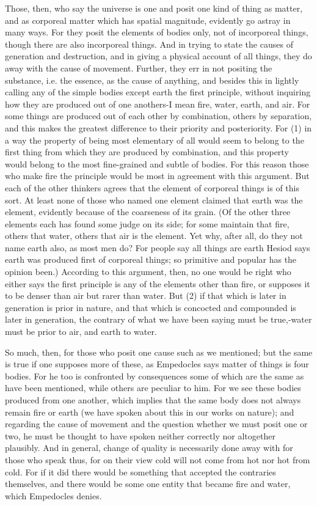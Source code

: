 \documentclass{article}
\begin{document}
Those, then, who say the universe is one and posit one kind of thing as matter, and as corporeal matter which has spatial magnitude, evidently go astray in many ways. For they posit the elements of bodies only, not of incorporeal things, though there are also incorporeal things. And in trying to state the causes of generation and destruction, and in giving a physical account of all things, they do away with the cause of movement. Further, they err in not positing the substance, i.e. the essence, as the cause of anything, and besides this in lightly calling any of the simple bodies except earth the first principle, without inquiring how they are produced out of one anothers-I mean fire, water, earth, and air. For some things are produced out of each other by combination, others by separation, and this makes the greatest difference to their priority and posteriority. For (1) in a way the property of being most elementary of all would seem to belong to the first thing from which they are produced by combination, and this property would belong to the most fine-grained and subtle of bodies. For this reason those who make fire the principle would be most in agreement with this argument. But each of the other thinkers agrees that the element of corporeal things is of this sort. At least none of those who named one element claimed that earth was the element, evidently because of the coarseness of its grain. (Of the other three elements each has found some judge on its side; for some maintain that fire, others that water, others that air is the element. Yet why, after all, do they not name earth also, as most men do? For people say all things are earth Hesiod says earth was produced first of corporeal things; so primitive and popular has the opinion been.) According to this argument, then, no one would be right who either says the first principle is any of the elements other than fire, or supposes it to be denser than air but rarer than water. But (2) if that which is later in generation is prior in nature, and that which is concocted and compounded is later in generation, the contrary of what we have been saying must be true,-water must be prior to air, and earth to water.

So much, then, for those who posit one cause such as we mentioned; but the same is true if one supposes more of these, as Empedocles says matter of things is four bodies. For he too is confronted by consequences some of which are the same as have been mentioned, while others are peculiar to him. For we see these bodies produced from one another, which implies that the same body does not always remain fire or earth (we have spoken about this in our works on nature); and regarding the cause of movement and the question whether we must posit one or two, he must be thought to have spoken neither correctly nor altogether plausibly. And in general, change of quality is necessarily done away with for those who speak thus, for on their view cold will not come from hot nor hot from cold. For if it did there would be something that accepted the contraries themselves, and there would be some one entity that became fire and water, which Empedocles denies.
\end{document}
